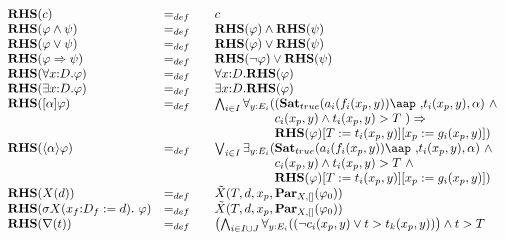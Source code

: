 \documentclass{article}
\begin{document}
\begin{equation*}
\begin{array}{lll}
{\mathbf{RHS}}(c) & =_{def} & c \\
{\mathbf{RHS}}(\varphi \wedge \psi ) & =_{def} & {\mathbf{RHS}}(\varphi
)\wedge {\mathbf{RHS}}(\psi ) \\
{\mathbf{RHS}}(\varphi \vee \psi ) & =_{def} & {\mathbf{RHS}}(\varphi )\vee {%
\mathbf{RHS}}(\psi ) \\
{\mathbf{RHS}}(\varphi \Rightarrow \psi ) & =_{def} & {\mathbf{RHS}}(\lnot
\varphi )\vee {\mathbf{RHS}}(\psi ) \\
{\mathbf{RHS}}(\forall {x{:}D}.\varphi ) & =_{def} & \forall {x{:}D}.{%
\mathbf{RHS}}(\varphi ) \\
{\mathbf{RHS}}(\exists {x{:}D}.\varphi ) & =_{def} & \exists {x{:}D}.{%
\mathbf{RHS}}(\varphi ) \\
{\mathbf{RHS}}([\alpha ]\varphi ) & =_{def} & \bigwedge_{i{\in }I}\forall _{y%
{:}E_{i}}((\mathbf{Sat}_{true }(a_{i}(f_{i}(x_{p},y))\mbox{\aap ,}%
t_{i}(x_{p},y),\alpha )\ \wedge \\
&  & \phantom{\bigwedge_{i {\in} I} \forall_{y {:} E_i}(}c_{i}(x_{p},y)%
\wedge t_{i}(x_{p},y)>T\ )\Rightarrow \\
&  & \phantom{\bigwedge_{i {\in} I} \forall_{y {:} E_i}(} {\mathbf{RHS}}%
(\varphi )[T:=t_{i}(x_{p},y)][x_{p}:=g_{i}(x_{p},y)]) \\
{\mathbf{RHS}}(\langle \alpha \rangle \varphi ) & =_{def} & \bigvee_{i{\in }%
I}\exists _{y{:}E_{i}}(\mathbf{Sat}_{true }(a_{i}(f_{i}(x_{p},y))%
\mbox{\aap
,}t_{i}(x_{p},y),\alpha )\ \wedge \\
&  & \phantom{\bigvee_{i {\in} I} \exists_{y {:} E_i}(}c_{i}(x_{p},y)\wedge
t_{i}(x_{p},y)>T\ \wedge \\
&  & \phantom{\bigvee_{i {\in} I} \exists_{y {:} E_i}(} {\mathbf{RHS}}%
(\varphi )[T:=t_{i}(x_{p},y)][x_{p}:=g_{i}(x_{p},y)]) \\
{\mathbf{RHS}}(X(d)) & =_{def} & \tilde{X}(T,d,x_{p},\mathbf{Par}%
_{X,[]}(\varphi _{0})) \\
{\mathbf{RHS}}(\sigma X(x_{f}{:}D_{f}:=d).~\varphi ) & =_{def}~~~ & \tilde{X}%
(T,d,x_{p},\mathbf{Par}_{X,[]}(\varphi _{0})) \\
{\mathbf{RHS}}(\nabla (t)) & =_{def} & \left( \bigwedge_{i{\in }I\cup
J}\forall _{y{:}E_{i}}((\lnot c_{i}(x_{p},y)\vee t>t_{k}(x_{p},y))\right)
\wedge t>T \\

\end{array}
\end{equation*}
\end{document}
